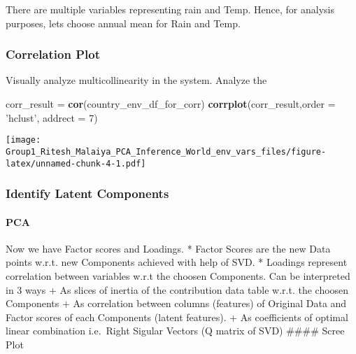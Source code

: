 \documentclass[]{article}
\newenvironment{Shaded}{\begin{snugshade}}{\end{snugshade}}
\newcommand{\DataTypeTok}[1]{\textcolor[rgb]{0.13,0.29,0.53}{#1}}
\newcommand{\DecValTok}[1]{\textcolor[rgb]{0.00,0.00,0.81}{#1}}
\newcommand{\KeywordTok}[1]{\textcolor[rgb]{0.13,0.29,0.53}{\textbf{#1}}}
\newcommand{\NormalTok}[1]{#1}
\newcommand{\OperatorTok}[1]{\textcolor[rgb]{0.81,0.36,0.00}{\textbf{#1}}}
\newcommand{\OtherTok}[1]{\textcolor[rgb]{0.56,0.35,0.01}{#1}}
\newcommand{\StringTok}[1]{\textcolor[rgb]{0.31,0.60,0.02}{#1}}
\let\oldparagraph\paragraph
\renewcommand{\paragraph}[1]{\oldparagraph{#1}\mbox{}}
\begin{document}
There are multiple variables representing rain and Temp. Hence, for
analysis purposes, lets choose annual mean for Rain and Temp.

\hypertarget{correlation-plot}{%
\subsubsection{Correlation Plot}\label{correlation-plot}}

Visually analyze multicollinearity in the system. Analyze the

\begin{Shaded}
\begin{Highlighting}[]
\NormalTok{corr_result =}\StringTok{ }\KeywordTok{cor}\NormalTok{(country_env_df_for_corr)}
\KeywordTok{corrplot}\NormalTok{(corr_result,}\DataTypeTok{order =} \StringTok{'hclust'}\NormalTok{, }\DataTypeTok{addrect =} \DecValTok{7}\NormalTok{)}
\end{Highlighting}
\end{Shaded}

\texttt{[image: Group1\_Ritesh\_Malaiya\_PCA\_Inference\_World\_env\_vars\_files/figure-latex/unnamed-chunk-4-1.pdf]}

\hypertarget{identify-latent-components}{%
\subsubsection{Identify Latent
Components}\label{identify-latent-components}}

\hypertarget{pca}{%
\paragraph{PCA}\label{pca}}

\begin{Shaded}
\end{Shaded}

Now we have Factor scores and Loadings. * Factor Scores are the new Data
points w.r.t. new Components achieved with help of SVD. * Loadings
represent correlation between variables w.r.t the choosen Components.
Can be interpreted in 3 ways + As slices of inertia of the contribution
data table w.r.t. the choosen Components + As correlation between
columns (features) of Original Data and Factor scores of each Components
(latent features). + As coefficients of optimal linear combination
i.e.~Right Sigular Vectors (Q matrix of SVD) \#\#\#\# Scree Plot
\end{document}
